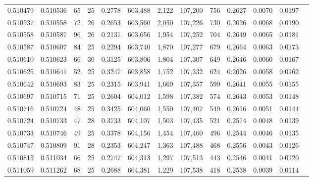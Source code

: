 \begin{tabular}{rrrrrrrrrrrrr}
0.510479 & 0.510536 &  65 &  25 &                                     0.2778 & 603,488 &   2,122 & 107,200 &     756 & 0.2627 & 0.0070 & 0.0197 \\
0.510537 & 0.510558 &  72 &  26 &                                     0.2653 & 603,560 &   2,050 & 107,226 &     730 & 0.2626 & 0.0068 & 0.0190 \\
0.510558 & 0.510587 &  96 &  26 &                                     0.2131 & 603,656 &   1,954 & 107,252 &     704 & 0.2649 & 0.0065 & 0.0181 \\
0.510587 & 0.510607 &  84 &  25 &                                     0.2294 & 603,740 &   1,870 & 107,277 &     679 & 0.2664 & 0.0063 & 0.0173 \\
0.510610 & 0.510623 &  66 &  30 &                                     0.3125 & 603,806 &   1,804 & 107,307 &     649 & 0.2646 & 0.0060 & 0.0167 \\
0.510625 & 0.510641 &  52 &  25 &                                     0.3247 & 603,858 &   1,752 & 107,332 &     624 & 0.2626 & 0.0058 & 0.0162 \\
0.510642 & 0.510693 &  83 &  25 &                                     0.2315 & 603,941 &   1,669 & 107,357 &     599 & 0.2641 & 0.0055 & 0.0155 \\
0.510697 & 0.510715 &  71 &  25 &                                     0.2604 & 604,012 &   1,598 & 107,382 &     574 & 0.2643 & 0.0053 & 0.0148 \\
0.510716 & 0.510724 &  48 &  25 &                                     0.3425 & 604,060 &   1,550 & 107,407 &     549 & 0.2616 & 0.0051 & 0.0144 \\
0.510724 & 0.510733 &  47 &  28 &                                     0.3733 & 604,107 &   1,503 & 107,435 &     521 & 0.2574 & 0.0048 & 0.0139 \\
0.510733 & 0.510746 &  49 &  25 &                                     0.3378 & 604,156 &   1,454 & 107,460 &     496 & 0.2544 & 0.0046 & 0.0135 \\
0.510747 & 0.510809 &  91 &  28 &                                     0.2353 & 604,247 &   1,363 & 107,488 &     468 & 0.2556 & 0.0043 & 0.0126 \\
0.510815 & 0.511034 &  66 &  25 &                                     0.2747 & 604,313 &   1,297 & 107,513 &     443 & 0.2546 & 0.0041 & 0.0120 \\
0.511059 & 0.511262 &  68 &  25 &                                     0.2688 & 604,381 &   1,229 & 107,538 &     418 & 0.2538 & 0.0039 & 0.0114 \\

\end{tabular}

